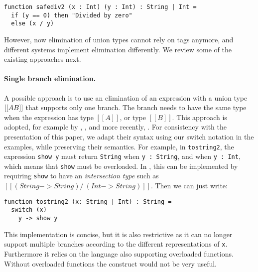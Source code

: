 \begin{lstlisting}
function safediv2 (x : Int) (y : Int) : String | Int =
  if (y == 0) then "Divided by zero"
  else (x / y)
\end{lstlisting}

\noindent However, now elimination of union types cannot rely on tags anymore, and
different systems implement elimination differently. We review some of the
existing approaches next.

\paragraph{Single branch elimination.}

A possible approach is to use an elimination of an expression with a union type
$[[A \/ B]]$ that supports only one branch. The branch needs to have the same
type when the expression has type $[[A]]$, or type $[[B]]$. This approach is
adopted, for example by \citet{pierce1991programming},
\citet{barbanera1995intersection}, and more recently,
\citet{dunfield2014elaborating}. For consistency with the presentation of this paper,
we adapt their syntax
using our switch notation in the examples, while preserving their semantics. For
example, in \lstinline{tostring2}, the expression \lstinline{show y} must return
\lstinline{String} when \lstinline{y : String}, and when \lstinline{y : Int},
which means that \lstinline{show} must be overloaded. In
\citet{pierce1991programming,dunfield2014elaborating,barbanera1995intersection},
this can be implemented by requiring \lstinline{show} to have an
\textit{intersection type} such as $[[(String -> String) /\ (Int -> String)]]$.
Then we can just write:

\begin{lstlisting}
function tostring2 (x: String | Int) : String =
  switch (x)
    y -> show y
\end{lstlisting}

\noindent This implementation is concise, but it is also restrictive as it can no longer
support multiple branches according to the different representations of
\lstinline{x}. Furthermore it relies on the language also supporting overloaded
functions. Without overloaded functions the construct would not be very useful.

